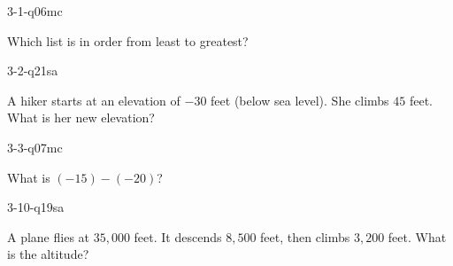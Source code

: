 \begin{practiceQuestion}{3-1-q06}{mc}
\begin{questionText}
Which list is in order from least to greatest?
\end{questionText}
\end{practiceQuestion}

\begin{practiceQuestion}{3-2-q21}{sa}
\begin{questionText}
A hiker starts at an elevation of $-30$ feet (below sea level). She climbs $45$ feet. What is her new elevation?
\end{questionText}
\end{practiceQuestion}

\begin{practiceQuestion}{3-3-q07}{mc}
\begin{questionText}
What is $(-15) - (-20)$?
\end{questionText}
\end{practiceQuestion}

\begin{practiceQuestion}{3-10-q19}{sa}
\begin{questionText}
A plane flies at $35{,}000$ feet. It descends $8{,}500$ feet, then climbs $3{,}200$ feet. What is the altitude?
\end{questionText}
\end{practiceQuestion}

